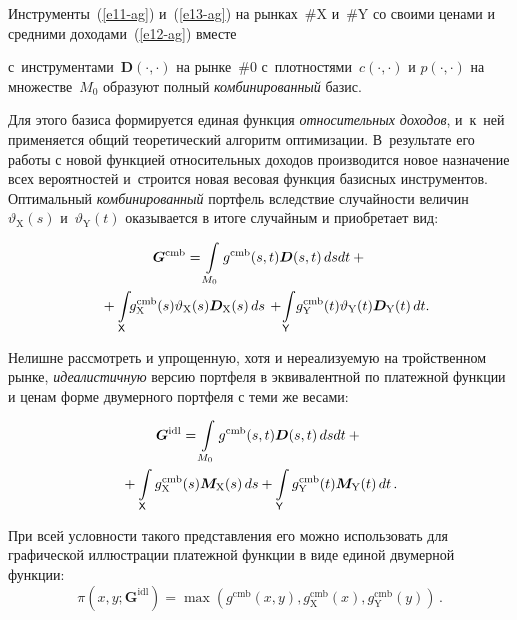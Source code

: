\begin{multicols}{2}
  Инструменты~(\ref{e11-ag}) и~(\ref{e13-ag}) на рынках~\#X и~\#Y со своими 
ценами и средними доходами~(\ref{e12-ag}) вместе\linebreak\vspace*{-12pt}

\pagebreak

\noindent 
с~инструментами~$\boldsymbol{D}(\cdot,\cdot)$ на рынке~\#0 
с~плотностями~$c(\cdot,\cdot)$ и $p(\cdot,\cdot)$ на множестве~$M_0$ 
образуют полный \textit{комбинированный} базис. 
  
  Для этого базиса формируется единая функция \textit{относительных 
доходов}, и~к~ней применяется общий теоретический алгоритм оптимизации. 
В~результате его работы с новой функцией относительных доходов 
производится новое назначение всех вероятностей и~строится новая весовая 
функция базисных инструментов. Оптимальный \textit{комбинированный} 
портфель вследствие случайности величин $\vartheta_{\mathrm{X}}(s)$ 
и~$\vartheta_{\mathrm{Y}}(t)$ оказывается в итоге случайным и приобретает вид: 

\noindent
  \begin{multline*}
  \boldsymbol{G}^{\mathrm{cmb}}=\int\limits_{M_0} g^{\mathrm{cmb}}(s,t) 
\boldsymbol{D}(s,t)\,ds dt+{}\\
  {}+\int\limits_{\sf X}\! \!g^{\mathrm{cmb}}_{\mathrm{X}}(s) \vartheta_{\mathrm{X}}(s) 
\boldsymbol{D}_{\mathrm{X}}(s)\,ds\,+\!\int\limits_{\sf Y} \!
g^{\mathrm{cmb}}_{\mathrm{Y}}(t) \vartheta_{\mathrm{Y}}(t) 
\boldsymbol{D}_{\mathrm{Y}}(t)\,dt.\hspace*{-7.25882pt}
  \end{multline*}
  
  Нелишне рассмотреть и упрощенную, хотя и нереализуемую на 
тройственном рынке, \textit{идеалистичную} версию портфеля в эквивалентной 
по платежной функции и ценам форме двумерного портфеля с теми же весами: 

\noindent
  \begin{multline}
  \boldsymbol{G}^{\mathrm{idl}}=\int\limits_{M_0} g^{\mathrm{cmb}}(s,t) 
\boldsymbol{D}(s,t)\,dsdt+{}\\
{}+\int\limits_{\sf X} 
g^{\mathrm{cmb}}_{\mathrm{X}}(s)\boldsymbol{M}_{\mathrm{X}}(s)\,ds+
  \int\limits_{\sf Y} 
g^{\mathrm{cmb}}_{\mathrm{Y}}(t)\boldsymbol{M}_{\mathrm{Y}}(t)\,dt\,.
  \label{e15-ag}
  \end{multline}
  
  При всей условности такого представления его можно использовать для 
графической иллюстрации платежной функции в виде единой двумерной 
функции:
  \begin{equation*}
  \pi\left( x,y;\boldsymbol{G}^{\mathrm{idl}}\right)= \max \left( g^{\mathrm{cmb}}(x,y), 
g^{\mathrm{cmb}}_{\mathrm{X}}(x), g^{\mathrm{cmb}}_{\mathrm{Y}}(y)\right)\,.
  \end{equation*}
  

\end{multicols}
